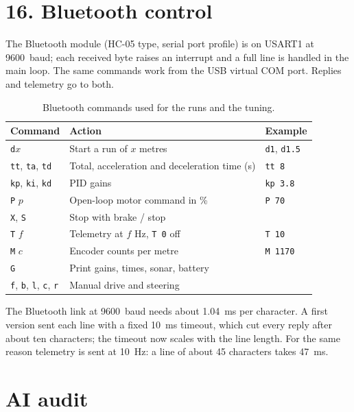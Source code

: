 \documentclass[letterpaper, 11pt]{article}
\begin{document}
\section*{16. Bluetooth control}

The Bluetooth module (HC-05 type, serial port profile) is on USART1 at \SI{9600}{baud}; each received byte raises an interrupt
and a full line is handled in the main loop. The same commands work from the USB
virtual COM port. Replies and telemetry go to both.

\begin{table}[H]
\centering
\caption{Bluetooth commands used for the runs and the tuning.}
\label{tab:bt}
\begin{tabular}{@{}lll@{}}
\toprule
Command & Action & Example \\
\midrule
\texttt{d}$x$ & Start a run of $x$ metres & \texttt{d1}, \texttt{d1.5} \\
\texttt{tt}, \texttt{ta}, \texttt{td} & Total, acceleration and deceleration time (s) & \texttt{tt 8} \\
\texttt{kp}, \texttt{ki}, \texttt{kd} & PID gains & \texttt{kp 3.8} \\
\texttt{P} $p$ & Open-loop motor command in \% & \texttt{P 70} \\
\texttt{X}, \texttt{S} & Stop with brake / stop & \\
\texttt{T} $f$ & Telemetry at $f$ Hz, \texttt{T 0} off & \texttt{T 10} \\
\texttt{M} $c$ & Encoder counts per metre & \texttt{M 1170} \\
\texttt{G} & Print gains, times, sonar, battery & \\
\texttt{f}, \texttt{b}, \texttt{l}, \texttt{c}, \texttt{r} & Manual drive and steering & \\
\bottomrule
\end{tabular}
\end{table}

The Bluetooth link at \SI{9600}{baud} needs about \SI{1.04}{\milli\second} per
character. A first version sent each line with a fixed \SI{10}{\milli\second}
timeout, which cut every reply after about ten characters; the timeout now scales
with the line length. For the same reason telemetry is sent at \SI{10}{\hertz}: a
line of about 45 characters takes \SI{47}{\milli\second}.

\section*{AI audit}
\end{document}
